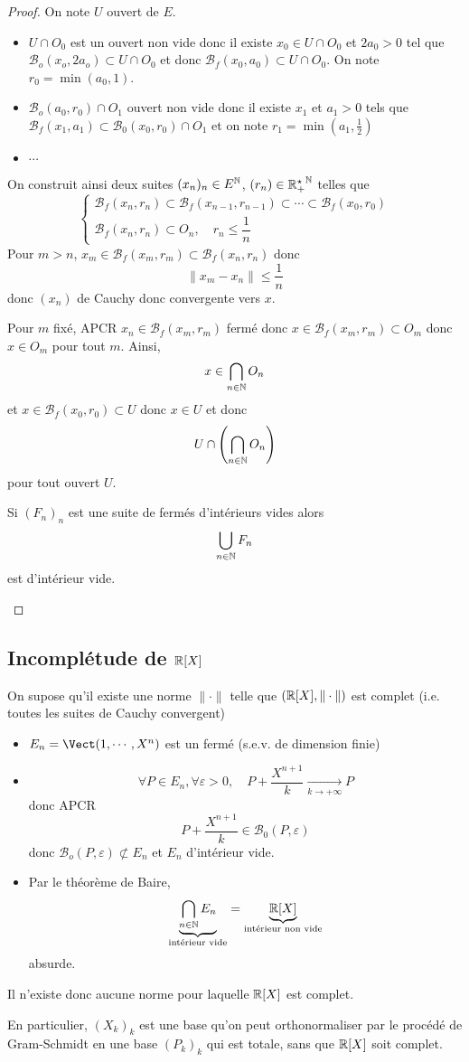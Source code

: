 \begin{proof}
On note $U$ ouvert de $E$.
\begin{itemize}
    \item
$U\cap O_0$ est un ouvert non vide donc il existe $x_0\in U\cap O_0$ et $2a_0>0$ tel que $\mathcal B_o(x_o, 2a_o)\subset U\cap O_0$ et donc $\mathcal B_f(x_0, a_0)\subset U\cap O_0$. On note $r_0=\min(a_0, 1)$.
\item $\mathcal B_o(a_0, r_0)\cap O_1$ ouvert non vide donc il existe $x_1$ et $a_1>0$ tels que $\mathcal B_f(x_1, a_1)\subset \mathcal B_0(x_0, r_0)\cap O_1$ et on note $r_1=\min\left(a_1, \frac12\right)$

\item $\cdots$
\end{itemize}
On construit ainsi deux suites $(x_n)_n\in E^{\mathbb N}$, $(r_n)\in\mathbb {R_+^\star}^{\mathbb N}$ telles que \[
    \begin{cases}
        \mathcal B_f(x_n, r_n)\subset \mathcal B_f(x_{n-1}, r_{n-1})\subset \cdots \subset \mathcal B_f(x_0, r_0) \\
        \mathcal B_f(x_n, r_n)\subset O_n, \quad r_n\leq \dfrac 1n
    \end{cases}
\]
Pour $m>n$, $x_m\in\mathcal B_f(x_m, r_m)\subset\mathcal B_f(x_n, r_n)$ donc \[
    \|x_m-x_n\|\leq \frac 1n
\]
donc $(x_n)$ de Cauchy donc convergente vers $x$.

Pour $m$ fixé, APCR $x_n\in\mathcal B_f(x_m, r_m)$ fermé donc $x\in\mathcal B_f(x_m, r_m)\subset O_m$ donc $x\in O_m$ pour tout $m$. Ainsi, \[
    x\in\bigcap_{n\in\mathbb N}O_n
\]
et $x\in\mathcal B_f(x_0, r_0)\subset U$ donc $x\in U$ et donc \[
    U\cap\left(\bigcap_{n\in\mathbb N}O_n\right)
\]
pour tout ouvert $U$.

\begin{cor}
Si $(F_n)_n$ est une suite de fermés d'intérieurs vides alors \[
    \bigcup_{n\in\mathbb N}F_n
\] est d'intérieur vide.
\end{cor}
\end{proof}

\subsection{Incomplétude de {$\mathbb R[X]$}}

On supose qu'il existe une norme $\|\cdot \|$ telle que $(\mathbb R[X], \|\cdot \|)$ est complet (i.e. toutes les suites de Cauchy convergent)

\begin{itemize}
    \item $E_n=\Vect(1, \cdots, X^n)$ est un fermé (s.e.v. de dimension finie)
    \item \[
    \forall P\in E_n, \forall \varepsilon>0, \quad P+\frac{X^{n+1}}k\xrightarrow[k\to+\infty]{} P
    \] donc APCR \[
        P+\frac{X^{n+1}}k \in \mathcal B_0(P, \varepsilon)
    \]
    donc $\mathcal B_o(P, \varepsilon)\not\subset E_n$ et $E_n$ d'intérieur vide.
    \item Par le théorème de Baire, \[
        \underbrace{\bigcap_{n\in\mathbb N} E_n}_{\text{intérieur vide}}=\underbrace{\mathbb R[X]}_{\text{intérieur non vide}}
    \]
    absurde.
\end{itemize}

Il n'existe donc aucune norme pour laquelle $\mathbb R[X]$ est complet.

En particulier, $(X_k)_k$ est une base qu'on peut orthonormaliser par le procédé de Gram-Schmidt en une base $(P_k)_k$ qui est totale, sans que $\mathbb R[X]$ soit complet.
\endchapter
